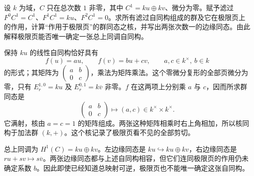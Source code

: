 \begin{exercise}\label{g2:ex:edge-map-shear}
	设 \(k\) 为域，\(C\) 只在总次数 \(1\) 非零，其中 \(C^1=ku\oplus kv\)、微分为零。赋予滤过 \(F^0C^1=C^1\)、\(F^1C^1=ku\)、\(F^2C^1=0\)。求所有滤过自同构组成的群及它在极限页上的作用，计算“作用于极限页”的群同态之核，并写出两张次数一的边缘同态。由此解释极限页能否唯一确定一张总上同调自同构。
\end{exercise}
\begin{solution}
	保持 \(ku\) 的线性自同构恰好具有
	\[
		f(u)=a u,\qquad f(v)=b u+c v,\qquad a,c\in k^\times,\ b\in k
	\]
	的形式；其矩阵为 \(\begin{pmatrix}a&b\\0&c\end{pmatrix}\)，乘法为矩阵乘法。这个零微分复形的全部页微分为零，只有 \(E_r^{1,0}=ku\) 及 \(E_r^{0,1}=k\overline v\) 非零。\(f\) 在这两项上分别乘 \(a\) 与 \(c\)，因而所求群同态是
	\[
		\begin{pmatrix}a&b\\0&c\end{pmatrix}\longmapsto(a,c)\in k^\times\times k^\times.
	\]
	它满射，核由 \(a=c=1\) 的矩阵组成。两张这种矩阵相乘时右上角相加，所以核同构于加法群 \((k,+)\)。这个核记录了极限页看不见的全部剪切。

	总上同调为 \(H^1(C)=ku\oplus kv\)。左边缘同态是 \(ku\hookrightarrow ku\oplus kv\)，右边缘同态是 \(ru+sv\mapsto s\overline v\)。两张边缘同态都与上述自同构相容，但它们连同极限页的作用仍未确定系数 \(b\)。因此即使已经知道总映射可逆，极限页也不能唯一确定这张自同构。
\end{solution}


